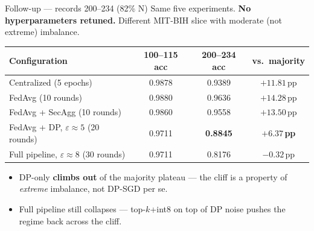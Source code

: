 \documentclass[10pt,aspectratio=169]{beamer}
\begin{document}
\begin{frame}{Follow-up --- records 200--234 (82\% N)}
  Same five experiments. \textbf{No hyperparameters retuned.} Different MIT-BIH slice with moderate (not extreme) imbalance.
  \vspace{0.4em}
  \begin{table}
    \centering
    \footnotesize
    \begin{tabular}{lccc}
      \toprule
      Configuration & 100--115 acc & 200--234 acc & vs.\ majority \\
      \midrule
      Centralized (5 epochs)                          & 0.9878 & 0.9389 & $+11.81$\,pp \\
      FedAvg (10 rounds)                              & 0.9880 & 0.9636 & $+14.28$\,pp \\
      FedAvg + SecAgg (10 rounds)                     & 0.9860 & 0.9558 & $+13.50$\,pp \\
      FedAvg + DP, $\varepsilon \approx 5$ (20 rounds)& 0.9711 & \textbf{0.8845} & $\mathbf{+6.37}$\,\textbf{pp} \\
      Full pipeline, $\varepsilon \approx 8$ (30 rounds)& 0.9711 & 0.8176 & $-0.32$\,pp \\
      \bottomrule
    \end{tabular}
  \end{table}
  \vspace{0.4em}
  \begin{itemize}
    \item DP-only \textbf{climbs out} of the majority plateau --- the cliff is a property of \emph{extreme} imbalance, not DP-SGD per se.
    \item Full pipeline still collapses --- top-$k$+int8 on top of DP noise pushes the regime back across the cliff.
  \end{itemize}
\end{frame}
\end{document}
